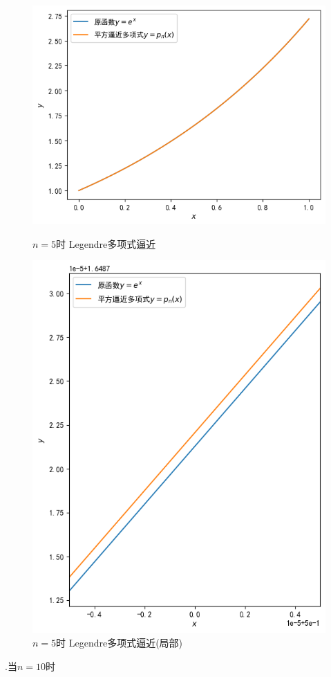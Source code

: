 \documentclass[UTF8,ctexart,a4paper,11pt,openany]{article}
\theoremstyle{definition}
\begin{document}
    \begin{figure}[H]
            \centering
        
        \begin{minipage}{0.49\linewidth}
            \centering
            \includegraphics[width=0.9\linewidth]{pics/P5.2.png}
            \caption{$n=5$时 Legendre多项式逼近}
        \end{minipage}
        \begin{minipage}{0.49\linewidth}
            \centering
            \includegraphics[width=0.9\linewidth]{pics/P5.5.png}
            \caption{$n=5$时 Legendre多项式逼近(局部)}
        \end{minipage}
    \end{figure}
    .\;当$n=10$时\\
\end{document}
